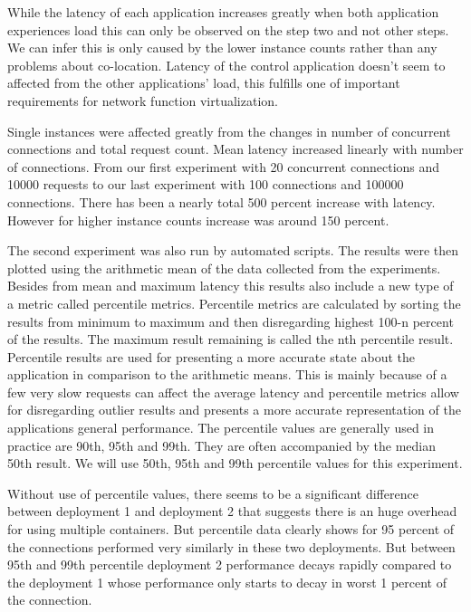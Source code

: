 \documentclass[12pt,oneandhalf,chaparabic,ceng,ms,eng,oneside,pntc]{gsufbe}
\begin{document}
While the latency of each application increases greatly when both application experiences load this can
only be observed on the step two and not other steps.  We can infer this is only caused by the lower
instance counts rather than any problems about co-location.  Latency of the control application doesn't
seem to affected from the other applications' load, this fulfills one of important requirements for
network function virtualization.

Single instances were affected greatly from the changes in number of concurrent connections and total
request count. Mean latency increased linearly with number of connections. From our first experiment
with 20 concurrent connections and 10000 requests to our last experiment with 100 connections and 
100000 connections. There has been a nearly total 500 percent increase with latency. However for higher
instance counts increase was around 150 percent.

The second experiment was also run by automated scripts.  The results were then plotted using the 
arithmetic mean of the data collected from the experiments. Besides from mean and maximum latency this
results also include a new type of a metric called percentile metrics. Percentile metrics are 
calculated by sorting the results from minimum to maximum and then disregarding highest 100-n
percent of the results. The maximum result remaining is called the nth percentile result. Percentile
results are used for presenting a more accurate state about the application in comparison to the
arithmetic means.  This is mainly because of a few very slow requests can affect the average latency
and percentile metrics allow for disregarding outlier results and presents a more accurate
representation of the applications general performance. The percentile values are generally used in
practice
are 90th, 95th and 99th. They are often accompanied by the median 50th result. We will use 50th, 95th
and 99th percentile values for this experiment.

Without use of percentile values, there seems to be a significant difference between deployment 1 and
deployment 2 that suggests there is an huge overhead for using multiple containers. But percentile data
clearly shows for 95 percent of the connections performed very similarly in these two deployments.
But between 95th and 99th percentile deployment 2 performance decays rapidly compared to the deployment
1 whose performance only starts to decay in worst 1 percent of the connection.
\end{document}
